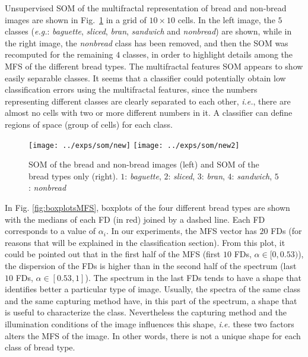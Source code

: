 Unsupervised SOM of the multifractal representation of bread and non-bread images are shown in Fig.~\ref{fig:somfractal} in a grid of $10\times10$ cells. In the left image, the $5$ classes ({\em e.g.}: {\em baguette}, {\em sliced}, {\em bran}, {\em sandwich} and {\em nonbread}) are shown, while in the right image, the {\em nonbread} class has been removed, and then the SOM was recomputed for the remaining $4$ classes, in order to highlight details among the MFS of the different bread types. The multifractal features SOM appears to show easily separable classes. It seems that a classifier could potentially obtain low classification errors using the multifractal features, since the numbers representing different classes are clearly separated to each other, {\em i.e.}, there are almost no cells with two or more different numbers in it. A classifier can define regions of space (group of cells) for each class.
\begin{figure}
\begin{centering}
\texttt{[image: ../exps/som/new]}
\texttt{[image: ../exps/som/new2]}
\caption{SOM of the bread and non-bread images (left) and SOM of the bread types only (right). $1$: {\em baguette}, $2$: {\em sliced}, $3$: {\em bran}, $4$: {\em sandwich}, $5$: {\em nonbread} }
\label{fig:somfractal}
\end{centering}
\end{figure}

In Fig. \ref{fig:boxplotsMFS}, boxplots of the four different bread types are shown with the medians of each FD (in red) joined by a dashed line. Each FD corresponds to a value of $\alpha_{i}$. In our experiments, the MFS vector has $20$ FDs (for reasons that will be explained in the classification section). From this plot, it could be pointed out that in the first half of the MFS (first $10$ FDs, $\alpha \in [0,0.53)$), the dispersion of the FDs is higher than in the second half of the spectrum (last $10$ FDs, $\alpha \in [0.53,1]$). The spectrum in the last FDs tends to have a shape that identifies better a particular type of image. Usually, the spectra of the same class and the same capturing method have, in this part of the spectrum, a shape that is useful to characterize the class. Nevertheless the capturing method and the illumination conditions of the image influences this shape, {\em i.e.} these two factors alters the MFS of the image. In other words, there is not a unique shape for each class of bread type.


